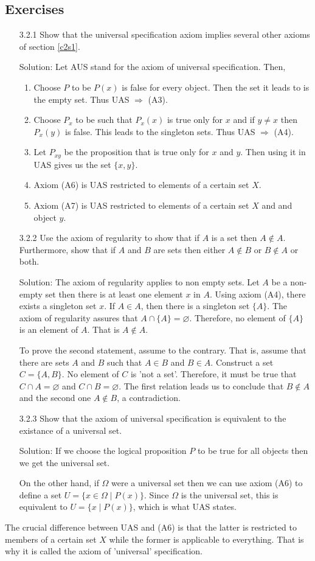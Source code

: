 \subsection{Exercises}
\begin{enumerate}
\item[3.2.1] Show that the universal specification axiom implies several
other axioms of section \ref{c2s1}.
\item[Solution:] Let AUS stand for the axiom of universal specification.
Then,
\begin{enumerate}
\item Choose $P$ to be $P(x)$ is false for every object. Then the set it
leads to is the empty set. Thus UAS $\Rightarrow$ (A3).
\item Choose $P_x$ to be such that $P_x(x)$ is true only for $x$ and if 
$y \ne x$ then $P_x(y)$ is false. This leads to the singleton sets. Thus 
UAS $\Rightarrow$ (A4).
\item Let $P_{xy}$ be the proposition that is true only for $x$ and $y$.
Then using it in UAS gives us the set $\{x, y\}$.
\item Axiom (A6) is UAS restricted to elements of a certain set $X$.
\item Axiom (A7) is UAS restricted to elements of a certain set $X$ and
and object $y$.
\end{enumerate}

\item[3.2.2] Use the axiom of regularity to show that if $A$ is a set
then $A \notin A$. Furthermore, show that if $A$ and $B$ are sets then
either $A \notin B$ or $B \notin A$ or both.
\item[Solution:] The axiom of regularity applies to non empty sets. Let
$A$ be a non-empty set then there is at least one element $x$ in $A$. 
Using axiom (A4), there exists a singleton set ${x}$. If $A \in A$, then
there is a singleton set $\{A\}$. The axiom of regularity assures that
$A \cap \{A\} = \varnothing$. Therefore, no element of $\{A\}$ is an 
element of $A$. That is $A \notin A$.

To prove the second statement, assume to the contrary. That is, assume that
there are sets $A$ and $B$ such that $A \in B$ and $B \in A$. Construct
a set $C = \{A, B\}$. No element of $C$ is 'not a set'. Therefore, it
must be true that $C \cap A = \varnothing$ and $C \cap B = \varnothing$.
The first relation leads us to conclude that $B \notin A$ and the second
one $A \notin B$, a contradiction.

\item[3.2.3] Show that the axiom of universal specification is equivalent
to the existance of a universal set.
\item[Solution:] If we choose the logical proposition $P$ to be true for
all objects then we get the universal set.

On the other hand, if $\Omega$ were a universal set then we can use axiom
(A6) to define a set $U = \{x \in \Omega \;|\; P(x)\}$. Since $\Omega$ is 
the universal set, this is equivalent to $U = \{x\;|\; P(x)\}$, which is
what UAS states.
\end{enumerate}

The crucial difference between UAS and (A6) is that the latter is 
restricted to members of a certain set $X$ while the former is applicable 
to everything. That is why it is called the axiom of 'universal' 
specification.
